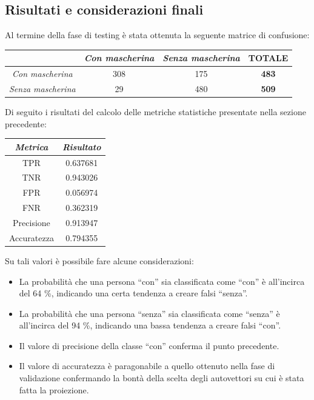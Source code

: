 \documentclass[12pt]{article}
\begin{document}
\subsection{Risultati e considerazioni finali}
Al termine della fase di testing è stata ottenuta la seguente matrice di confusione:
\begin{center}
\begin{tabular}{cccc}
    \toprule
    & \textit{Con mascherina} & \textit{Senza mascherina} & \textbf{TOTALE} \\
    
    \midrule
    \textit{Con mascherina} & 308 & 175 & \textbf{483} \\
    
    \midrule
    \textit{Senza mascherina} & 29 & 480 & \textbf{509} \\
    
    \bottomrule
\end{tabular}
\end{center}
Di seguito i risultati del calcolo delle metriche statistiche presentate nella sezione precedente:
\begin{center}
\begin{tabular}{cc}
    \toprule
    \textit{Metrica} & \textit{Risultato} \\
    
    \midrule
    TPR & 0.637681 \\
    \midrule
    TNR & 0.943026 \\
    \midrule
    FPR & 0.056974 \\
    \midrule
    FNR & 0.362319 \\
    \midrule
    Precisione & 0.913947 \\
    \midrule
    Accuratezza & 0.794355 \\
    
    \bottomrule
\end{tabular}
\end{center}
Su tali valori è possibile fare alcune considerazioni:
\begin{itemize}
    \item La probabilità che una persona ``con'' sia classificata come ``con'' è all'incirca del 64 \%, indicando una certa tendenza a creare falsi ``senza''.
    \item La probabilità che una persona ``senza'' sia classificata come ``senza'' è all'incirca del 94 \%, indicando una bassa tendenza a creare falsi ``con''.
    \item Il valore di precisione della classe ``con'' conferma il punto precedente.
    \item Il valore di accuratezza è paragonabile a quello ottenuto nella fase di validazione confermando la bontà della scelta degli autovettori su cui è stata fatta la proiezione.
\end{itemize}
\end{document}
